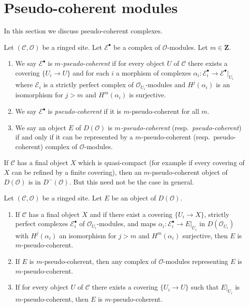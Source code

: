 \section{Pseudo-coherent modules}
\label{section-pseudo-coherent}

\noindent
In this section we discuss pseudo-coherent complexes.

\begin{definition}
\label{definition-pseudo-coherent}
Let $(\mathcal{C}, \mathcal{O})$ be a ringed site. Let $\mathcal{E}^\bullet$
be a complex of $\mathcal{O}$-modules. Let $m \in \mathbf{Z}$.
\begin{enumerate}
\item We say $\mathcal{E}^\bullet$ is {\it $m$-pseudo-coherent}
if for every object $U$ of $\mathcal{C}$ there exists a covering
$\{U_i \to U\}$ and for each $i$ a morphism of complexes
$\alpha_i : \mathcal{E}_i^\bullet \to \mathcal{E}^\bullet|_{U_i}$
where $\mathcal{E}_i$ is a strictly perfect complex of
$\mathcal{O}_{U_i}$-modules and $H^j(\alpha_i)$ is an isomorphism
for $j > m$ and $H^m(\alpha_i)$ is surjective.
\item We say $\mathcal{E}^\bullet$ is {\it pseudo-coherent}
if it is $m$-pseudo-coherent for all $m$.
\item We say an object $E$ of $D(\mathcal{O})$ is
{\it $m$-pseudo-coherent} (resp.\ {\it pseudo-coherent})
if and only if it can be represented by a $m$-pseudo-coherent
(resp.\ pseudo-coherent) complex of $\mathcal{O}$-modules.
\end{enumerate}
\end{definition}

\noindent
If $\mathcal{C}$ has a final object $X$ which is quasi-compact
(for example if every covering of $X$ can be refined by a finite covering),
then an $m$-pseudo-coherent object of $D(\mathcal{O})$ is in
$D^-(\mathcal{O})$. But this need not be the case in general.

\begin{lemma}
\label{lemma-pseudo-coherent-independent-representative}
Let $(\mathcal{C}, \mathcal{O})$ be a ringed site.
Let $E$ be an object of $D(\mathcal{O})$.
\begin{enumerate}
\item If $\mathcal{C}$ has a final object $X$ and if there exist a covering
$\{U_i \to X\}$, strictly perfect complexes $\mathcal{E}_i^\bullet$ of
$\mathcal{O}_{U_i}$-modules, and
maps $\alpha_i : \mathcal{E}_i^\bullet \to E|_{U_i}$ in
$D(\mathcal{O}_{U_i})$ with $H^j(\alpha_i)$ an isomorphism for $j > m$
and $H^m(\alpha_i)$ surjective, then $E$ is $m$-pseudo-coherent.
\item If $E$ is $m$-pseudo-coherent, then any complex of $\mathcal{O}$-modules
representing $E$ is $m$-pseudo-coherent.
\item If for every object $U$ of $\mathcal{C}$ there exists a covering
$\{U_i \to U\}$ such that $E|_{U_i}$ is $m$-pseudo-coherent, then
$E$ is $m$-pseudo-coherent.
\end{enumerate}
\end{lemma}

